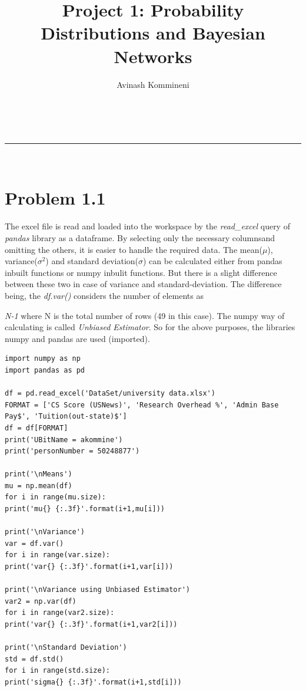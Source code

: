 \documentclass[a4paper,11pt]{article}
\makeatletter
\newcommand{\linia}{\rule{\linewidth}{0.5pt}}
\renewcommand{\maketitle}{
\begin{center}
\vspace{2ex}
{\LARGE \textsc{\@title}}
\vspace{1ex}
\\
\linia\\
\@author \hfill \@date
\vspace{4ex}
\end{center}
}
\makeatother
\begin{document}
\title{Project 1: Probability Distributions and Bayesian Networks}

\author{Avinash Kommineni} 


\maketitle

\section*{Problem 1.1}

The excel file is read and loaded into the workspace by the \textit{read\_excel} query of \textit{pandas} library as a dataframe. By selecting only the necessary columnsand omitting the others, it is easier to handle the required data. The mean($\mu$), variance($\sigma^2$) and standard deviation($\sigma$) can be calculated either from pandas inbuilt functions or numpy inbulit functions. But there is a slight difference between these two in case of variance and standard-deviation. The difference being, the \textit{df.var()} considers the number of elements as {\textit{N-1} where N is the total number of rows (49 in this case). The numpy way of calculating is called \textit{Unbiased Estimator}.
So for the above purposes, the libraries numpy and pandas are used (imported).

\begin{lstlisting}[label={list:first},caption= Calculating Mean Variance Standard deviation.]
import numpy as np
import pandas as pd

df = pd.read_excel('DataSet/university data.xlsx')
FORMAT = ['CS Score (USNews)', 'Research Overhead %', 'Admin Base Pay$', 'Tuition(out-state)$']
df = df[FORMAT]
print('UBitName = akommine')
print('personNumber = 50248877')

print('\nMeans')
mu = np.mean(df)
for i in range(mu.size):
print('mu{} {:.3f}'.format(i+1,mu[i]))

print('\nVariance')
var = df.var()
for i in range(var.size):
print('var{} {:.3f}'.format(i+1,var[i]))

print('\nVariance using Unbiased Estimator')
var2 = np.var(df)
for i in range(var2.size):
print('var{} {:.3f}'.format(i+1,var2[i]))

print('\nStandard Deviation')
std = df.std()
for i in range(std.size):
print('sigma{} {:.3f}'.format(i+1,std[i]))


\end{lstlisting}}
\end{document}
